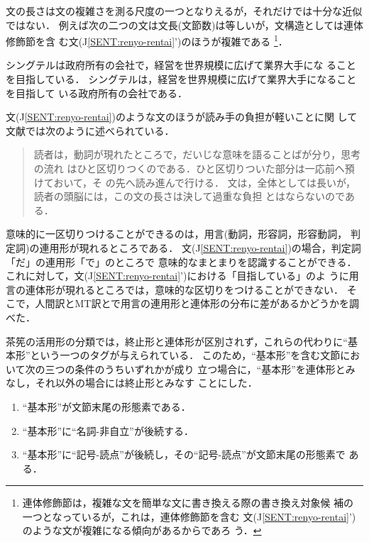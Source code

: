 文の長さは文の複雑さを測る尺度の一つとなりえるが，それだけでは十分な近似
ではない．
例えば次の二つの文は文長(文節数)は等しいが，文構造としては連体修飾節を含
む文(J\ref{SENT:renyo-rentai}')のほうが複雑である
\footnote{連体修飾節は，複雑な文を簡単な文に書き換える際の書き換え対象候
補の一つとなっている\cite{Nogami00}が，これは，連体修飾節を含む
文(J\ref{SENT:renyo-rentai}')のような文が複雑になる傾向があるからであろ
う．}．
\begin{JSENT}
\sentJ シングテルは政府所有の会社で，経営を世界規模に広げて業界大手にな
ることを目指している．
\sentJJ シングテルは，経営を世界規模に広げて業界大手になることを目指して
いる政府所有の会社である．
\label{SENT:renyo-rentai}
\end{JSENT}

文(J\ref{SENT:renyo-rentai})のような文のほうが読み手の負担が軽いことに関
して文献\cite{Yanabu79}では次のように述べられている．
\begin{quote}
読者は，動詞が現れたところで，だいじな意味を語ることばが分り，思考の流れ
はひと区切りつくのである．ひと区切りついた部分は一応前ヘ預けておいて，そ
の先へ読み進んで行ける．
文は，全体としては長いが，読者の頭脳には，この文の長さは決して過重な負担
とはならないのである．
\end{quote}

意味的に一区切りつけることができるのは，用言(動詞，形容詞，形容動詞，
判定詞)の連用形が現れるところである．
文(J\ref{SENT:renyo-rentai})の場合，判定詞「だ」の連用形「で」のところで
意味的なまとまりを認識することができる．
これに対して，文(J\ref{SENT:renyo-rentai}')における「目指している」のよ
うに用言の連体形が現れるところでは，意味的な区切りをつけることができない．
そこで，人間訳とMT訳とで用言の連用形と連体形の分布に差があるかどうかを調
べた．

茶筅の活用形の分類では，終止形と連体形が区別されず，これらの代わりに``基
本形''という一つのタグが与えられている．
このため，``基本形''を含む文節において次の三つの条件のうちいずれかが成り
立つ場合に，``基本形''を連体形とみなし，それ以外の場合には終止形とみなす
ことにした．
\begin{enumerate}
\item\label{enum:katsuyo:matsubi}
``基本形''が文節末尾の形態素である．
\item\label{enum:katsuyo:keishiki}
``基本形''に``名詞-非自立''が後続する． 
\item\label{enum:katsuyo:toten}
``基本形''に``記号-読点''が後続し，その``記号-読点''が文節末尾の形態素で
ある．  
\end{enumerate}

